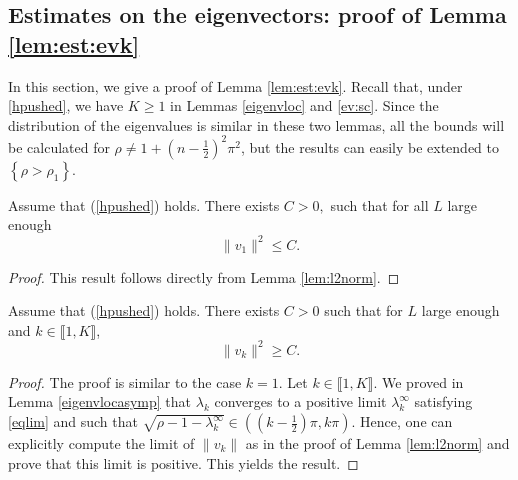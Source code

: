\documentclass[11pt]{article}
\theoremstyle{plain}
\begin{document}
\begin{appendix}
\section{Estimates on the eigenvectors: proof of Lemma \ref{lem:est:evk}}\label{appendix}
In this section, we give a proof of Lemma \ref{lem:est:evk}. Recall that, under \eqref{hpushed}, we have $K\geqslant 1$ in Lemmas \ref{eigenvloc} and  \ref{ev:sc}. Since the distribution of the eigenvalues is similar in these two lemmas, all the bounds will be calculated for $\rho\neq 1+\left(n-\frac{1}{2}\right)^2\pi^2$, but the results can easily be extended to $\left\{\rho>\rho_1\right\}$.
\begin{lem}
Assume that (\ref{hpushed}) holds. There exists $C>0,$ such that for all $L$ large enough 
\begin{equation*}
    \|v_1\|^2\leqslant C.
\end{equation*}
\label{lem:norm1}
\end{lem}
\begin{proof}
This result follows directly from Lemma \ref{lem:l2norm}.
\end{proof}
\begin{lem}
\label{lem:normk}
Assume that (\ref{hpushed}) holds. There exists $C>0$ such that for $L$ large enough and $k\in\llbracket1,K\rrbracket$,
\begin{equation*}
    \|v_k\|^2\geqslant C.  
\end{equation*}
\end{lem}
\begin{proof} The proof is similar to the case $k=1$. Let $k\in\llbracket1,K\rrbracket$. We proved in Lemma \ref{eigenvlocasymp} that $\lambda_k$ converges to a positive limit $ \lambda_k^\infty$ satisfying \eqref{eqlim} and such that 
$\sqrt{\rho-1-\lambda_k^\infty} \in \left(\left(k-\frac{1}{2}\right)\pi,k\pi\right).$ Hence, one can explicitly compute the limit of $\|v_k\|$ as in the proof of Lemma \ref{lem:l2norm} and prove that this limit is positive. This yields the result.

\end{proof}
\end{appendix}
\end{document}
